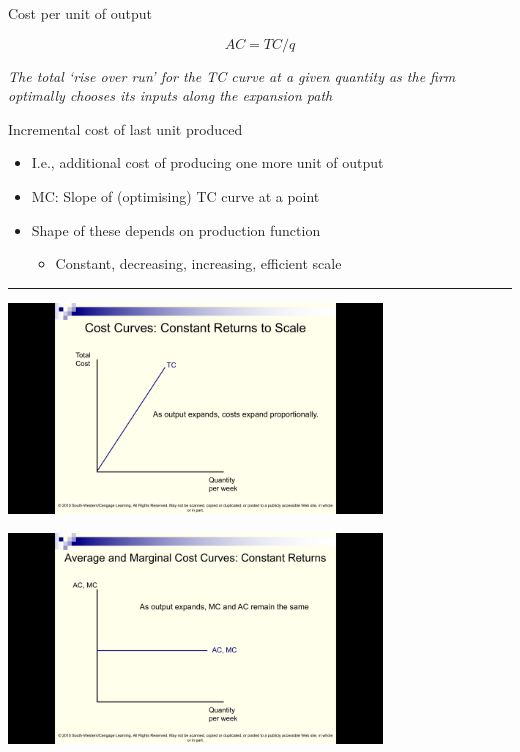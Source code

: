 \documentclass[]{article}
\providecommand{\tightlist}{%
  \setlength{\itemsep}{0pt}\setlength{\parskip}{0pt}}
\begin{document}
\begin{description}
\tightlist
\item[Average cost]
Cost per unit of output
\end{description}

\[AC=TC/q\]

\emph{The total `rise over run' for the TC curve at a given quantity as
the firm optimally chooses its inputs along the expansion path}

\begin{description}
\tightlist
\item[Marginal cost]
Incremental cost of last unit produced
\end{description}

\begin{itemize}
\item
  I.e., additional cost of producing one more unit of output
\item
  MC: Slope of (optimising) TC curve at a point
\item
  Shape of these depends on production function

  \begin{itemize}
  \tightlist
  \item
    Constant, decreasing, increasing, efficient scale
  \end{itemize}
\end{itemize}

\begin{center}\rule{0.5\linewidth}{\linethickness}\end{center}

\includegraphics[height=2.2in]{picsfigs/crsTCcurve.png}

\includegraphics[height=2.2in]{picsfigs/crscostcurves}
\end{document}
